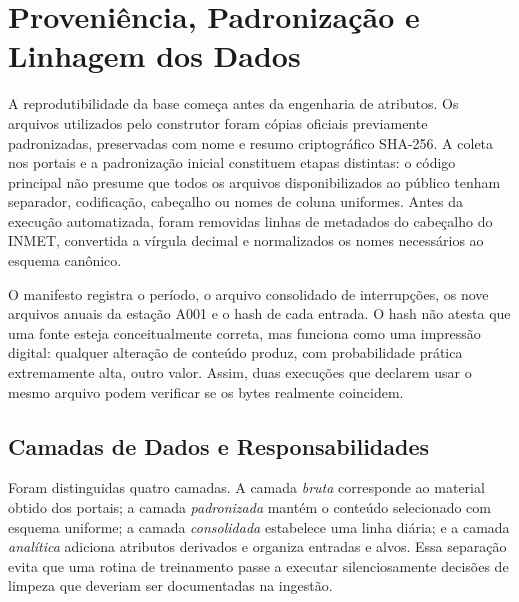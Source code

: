 \section{Proveniência, Padronização e Linhagem dos Dados}\label{sec:proveniencia_linhagem}

A reprodutibilidade da base começa antes da engenharia de atributos. Os arquivos utilizados pelo construtor foram cópias oficiais previamente padronizadas, preservadas com nome e resumo criptográfico SHA-256. A coleta nos portais e a padronização inicial constituem etapas distintas: o código principal não presume que todos os arquivos disponibilizados ao público tenham separador, codificação, cabeçalho ou nomes de coluna uniformes. Antes da execução automatizada, foram removidas linhas de metadados do cabeçalho do INMET, convertida a vírgula decimal e normalizados os nomes necessários ao esquema canônico.

O manifesto registra o período, o arquivo consolidado de interrupções, os nove arquivos anuais da estação A001 e o hash de cada entrada. O hash não atesta que uma fonte esteja conceitualmente correta, mas funciona como uma impressão digital: qualquer alteração de conteúdo produz, com probabilidade prática extremamente alta, outro valor. Assim, duas execuções que declarem usar o mesmo arquivo podem verificar se os bytes realmente coincidem.

\subsection{Camadas de Dados e Responsabilidades}

Foram distinguidas quatro camadas. A camada \textit{bruta} corresponde ao material obtido dos portais; a camada \textit{padronizada} mantém o conteúdo selecionado com esquema uniforme; a camada \textit{consolidada} estabelece uma linha diária; e a camada \textit{analítica} adiciona atributos derivados e organiza entradas e alvos. Essa separação evita que uma rotina de treinamento passe a executar silenciosamente decisões de limpeza que deveriam ser documentadas na ingestão.

